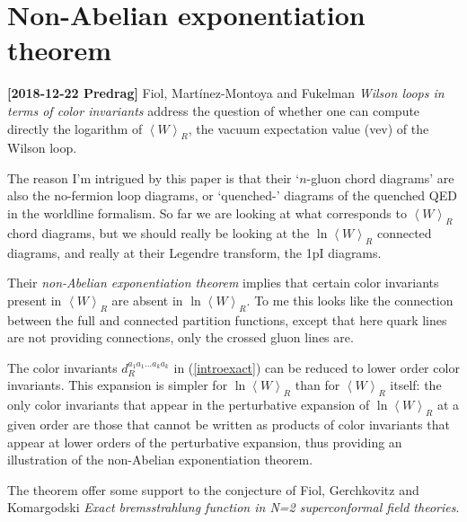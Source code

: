 

\section{Non-Abelian exponentiation theorem}
\label{s:FiMaFu18}
\newcommand{\vev}[1]{{\left< {#1} \right>}}

{\bf [2018-12-22 Predrag]}
Fiol, Martínez-Montoya and Fukelman {\em Wilson loops in
terms of color invariants} address the question of whether one can
compute directly the logarithm of $\vev{W}_R$, the vacuum expectation
value (vev) of the Wilson loop.

The reason I'm intrigued by this paper is that their `$n$-gluon chord
diagrams' are also the no-fermion loop diagrams, or `quenched-'
diagrams
of the quenched QED in
the worldline formalism. So far we are looking at what corresponds to
$\vev{W}_R$ chord diagrams, but we should really be looking at the $\ln
\vev{W}_R$ connected diagrams, and really at their Legendre transform,
the 1pI diagrams.

Their \emph{non-Abelian exponentiation theorem} implies that certain color
invariants present in $\vev{W}_R$ are absent in $\ln \vev{W}_R$.
To me this looks like the connection between the full and connected
partition functions, except that here quark lines are not providing
connections, only the crossed gluon lines are.

The color invariants $d_R^{a_1 a_1\dots a_k a_k}$ in (\ref{introexact})
can be reduced to lower order color invariants. This expansion is simpler
for $\ln \vev{W}_R$ than for $\vev{W}_R$ itself: the only color
invariants that appear in the perturbative expansion of $\ln \vev{W}_R$
at a given order are those that cannot be written as products of color
invariants that appear at lower orders of the perturbative expansion,
thus providing an illustration of the non-Abelian exponentiation theorem.

The theorem offer some support to the conjecture of
Fiol, Gerchkovitz and Komargodski
{\em Exact bremsstrahlung function in {N}=2 superconformal field theories}.


